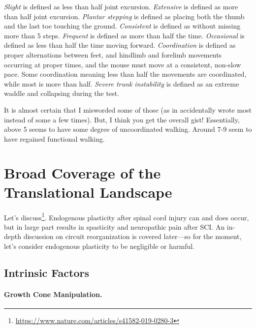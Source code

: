 \documentclass[12pt]{report}
\begin{document}
\textit{Slight} is defined as less than half joint excursion. \textit{Extensive} is defined as more than half joint excursion. \textit{Plantar stepping} is defined as placing both the thumb and the last toe touching the ground. \textit{Consistent} is defined as without missing more than 5 steps. \textit{Frequent} is defined as more than half the time. \textit{Occasional} is defined as less than half the time moving forward. \textit{Coordination} is defined as proper alternations between feet, and hindlimb and forelimb movements occurring at proper times, and the mouse must move at a consistent, non-slow pace. Some coordination meaning less than half the movements are coordinated, while most is more than half. \textit{Severe trunk instability} is defined as an extreme waddle and collapsing during the test.\newline

It is almost certain that I misworded some of those (as in accidentally wrote most instead of some a few times). But, I think you get the overall gist! Essentially, above 5 seems to have some degree of uncoordinated walking. Around 7-9 seem to have regained functional walking. 






\chapter{Broad Coverage of the Translational Landscape}

\label{sec:TranslationalLandscape}

Let's discuss\footnote{\url{https://www.nature.com/articles/s41582-019-0280-3}}. Endogenous plasticity after spinal cord injury can and does occur, but in large part results in spasticity and neuropathic pain after SCI. An in-depth discussion on circuit reorganization is covered later---so for the moment, let's consider endogenous plasticity to be negligible or harmful.\newline

\section{Intrinsic Factors}

\subsubsection{Growth Cone Manipulation.}
\end{document}
